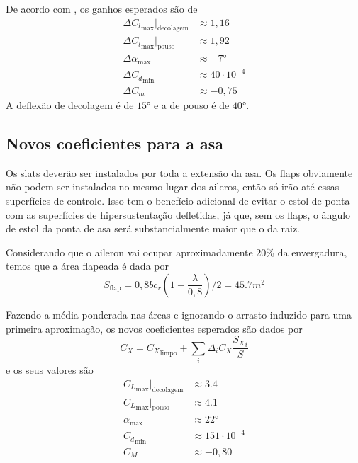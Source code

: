 De acordo com \cite{gudmundsson}, os ganhos esperados são de
\begin{align*}
    \Delta {C_l}_{\max}|_{\text{decolagem}} &\approx 1,16 \\
    \Delta {C_l}_{\max}|_{\text{pouso}} &\approx 1,92 \\
    \Delta {\alpha}_{\max} &\approx \ang{-7} \\
    \Delta {C_d}_{\min} &\approx 40\cdot 10^{-4} \\
    \Delta {C_m} &\approx -0,75 
\end{align*}
A deflexão de decolagem é de $\ang{15}$ e a de pouso é de $\ang{40}$.

\subsection{Novos coeficientes para a asa}
Os slats deverão ser instalados por toda a extensão da asa. Os flaps obviamente
não podem ser instalados no mesmo lugar dos aileros, então só irão até essas
superfícies de controle. Isso tem o benefício adicional de evitar o estol de
ponta com as superfícies de hipersustentação defletidas, já que, sem os flaps, o
ângulo de estol da ponta de asa será substancialmente maior que o da raiz.

Considerando que o aileron vai ocupar aproximadamente 20\% da envergadura, temos
que a área flapeada é dada por
\begin{equation}
    S_{\text{flap}} = 0,8 b c_r (1+\frac{\lambda}{0,8})/2 = 45.7\si{m^2}
\end{equation}

Fazendo a média ponderada nas áreas e ignorando o arrasto induzido para uma
primeira aproximação, os novos coeficientes esperados são dados por
\begin{equation}
    C_X = {C_X}_{\text{limpo}} + \sum_i{\Delta_i C_X \frac{{S_X}_i}{S}}
\end{equation}
e os seus valores são
\begin{align*}
    {C_L}_{\max}|_{\text{decolagem}} &\approx 3.4 \\
    {C_L}_{\max}|_{\text{pouso}} &\approx 4.1\\
    {\alpha}_{\max} &\approx \ang{22} \\
    {C_d}_{\min} &\approx 151\cdot 10^{-4} \\
    {C_M} &\approx -0,80 
\end{align*}
